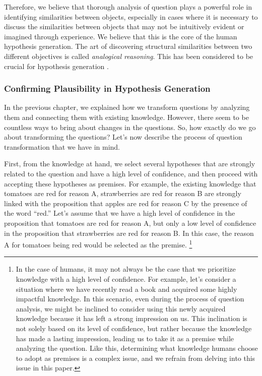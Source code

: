 Therefore, we believe that thorough analysis of question plays a powerful role in identifying similarities between objects, especially in cases where it is necessary to discuss the similarities between objects that may not be intuitively evident or imagined through experience. We believe that this is the core of the human hypothesis generation. The art of discovering structural similarities between two different objectives is called \textit{analogical reasoning}. This has been considered to be crucial for hypothesis generation \cite{hesse1965models,thagard_1984,gentner1993shift,holyoak1996mental,dunbar1997scientists,gentner2002analogy}. 

\subsubsection{Confirming Plausibility in Hypothesis Generation}

In the previous chapter, we explained how we transform questions by analyzing them and connecting them with existing knowledge. However, there seem to be countless ways to bring about changes in the questions. So, how exactly do we go about transforming the questions? Let's now describe the process of question transformation that we have in mind.


First, from the knowledge at hand, we select several hypotheses that are strongly related to the question and have a high level of confidence, and then proceed with accepting these hypotheses as premises. For example, the existing knowledge that tomatoes are red for reason A, strawberries are red for reason B  are strongly linked with the proposition that apples are red for reason C by the presence of the word ``red.'' Let's assume that we have a high level of confidence in the proposition that tomatoes are red for reason A, but only a low level of confidence in the proposition that strawberries are red for reason B. In this case, the reason A for tomatoes being red would be selected as the premise. \footnote{
In the case of humans, it may not always be the case that we prioritize knowledge with a high level of confidence. For example, let's consider a situation where we have recently read a book and acquired some highly impactful knowledge. In this scenario, even during the process of question analysis, we might be inclined to consider using this newly acquired knowledge because it has left a strong impression on us. This inclination is not solely based on its level of confidence, but rather because the knowledge has made a lasting impression, leading us to take it as a premise while analyzing the question. Like this, determining what knowledge humans choose to adopt as premises is a complex issue, and we refrain from delving into this issue in this paper.
}

